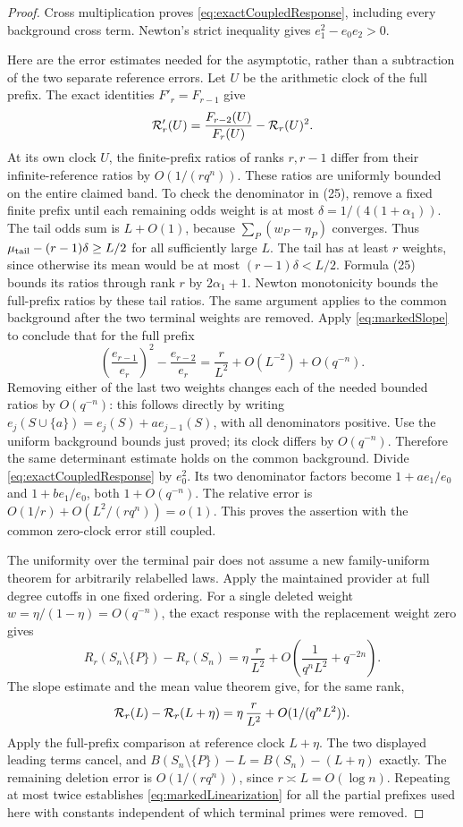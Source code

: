 \documentclass[11pt]{article}
\begin{document}
\begin{proof}
Cross multiplication proves \eqref{eq:exactCoupledResponse}, including
every background cross term. Newton's strict inequality gives
\(e_1^2-e_0e_2>0\).

Here are the error estimates needed for the asymptotic, rather than a
subtraction of the two separate reference errors. Let \(U\) be the
arithmetic clock of the full prefix. The exact identities
\(F'_r=F_{r-1}\) give
\[
 {\cal R}'_r(U)=\frac{F_{r-2}(U)}{F_r(U)}
                     -{\cal R}_r(U)^2.
\]
At its own clock \(U\), the finite-prefix ratios of ranks \(r,r-1\)
differ from their infinite-reference ratios by \(O(1/(r q^n))\).
These ratios are uniformly bounded on the entire claimed band.
To check the denominator in (25), remove a fixed finite prefix until
each remaining odds weight is at most
\(\delta=1/(4(1+\alpha_1))\).
The tail odds sum is \(L+O(1)\), because
\(\sum_P(w_P-\eta_P)\) converges. Thus
\(\mu_{\rm tail}-(r-1)\delta\geq L/2\) for all sufficiently large
\(L\). The tail has at least \(r\) weights, since otherwise its mean
would be at most \((r-1)\delta<L/2\).
Formula (25) bounds its ratios through rank \(r\) by \(2\alpha_1+1\).
Newton monotonicity bounds the full-prefix ratios by these tail
ratios. The same argument applies to the common background after
the two terminal weights are removed.
Apply \eqref{eq:markedSlope} to conclude that for the full prefix
\[
 \left(\frac{e_{r-1}}{e_r}\right)^2-\frac{e_{r-2}}{e_r}
       =\frac r{L^2}+O(L^{-2})+O(q^{-n}).
\]
Removing either of the last two weights changes each of the needed
bounded ratios by \(O(q^{-n})\): this follows directly by writing
\(e_j(S\cup\{a\})=e_j(S)+a e_{j-1}(S)\), with all denominators
positive. Use the uniform background bounds just proved; its clock
differs by \(O(q^{-n})\). Therefore the same determinant estimate
holds on the common background. Divide \eqref{eq:exactCoupledResponse}
by \(e_0^2\). Its two denominator factors become
\(1+a e_1/e_0\) and \(1+b e_1/e_0\), both \(1+O(q^{-n})\).
The relative error is
\(O(1/r)+O(L^2/(r q^n))=o(1)\). This proves the assertion with the
common zero-clock error still coupled.

The uniformity over the terminal pair does not assume a new
family-uniform theorem for arbitrarily relabelled laws. Apply the
maintained provider at full degree cutoffs in one fixed ordering.
For a single deleted weight \(w=\eta/(1-\eta)=O(q^{-n})\), the exact
response with the replacement weight zero gives
\[
 R_r(S_n\setminus\{P\})-R_r(S_n)
       =\eta\,\frac r{L^2}
          +O\left(\frac1{q^nL^2}+q^{-2n}\right).
\]
The slope estimate and the mean value theorem give, for the same rank,
\[
 {\cal R}_r(L)-{\cal R}_r(L+\eta)
       =\eta\,\frac r{L^2}+O(1/(q^nL^2)).
\]
Apply the full-prefix comparison at reference clock \(L+\eta\).
The two displayed leading terms cancel, and
\(B(S_n\setminus\{P\})-L=B(S_n)-(L+\eta)\) exactly.
The remaining deletion error is \(O(1/(r q^n))\), since
\(r\asymp L=O(\log n)\). Repeating at most twice establishes
\eqref{eq:markedLinearization} for all the partial prefixes used here
with constants independent of which terminal primes were removed.
\end{proof}
\end{document}
